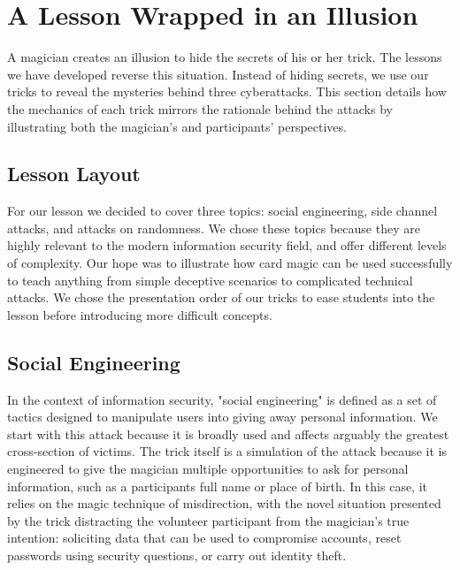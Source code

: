 \section{A Lesson Wrapped in an Illusion}
\label{SEC:background}


A magician creates an illusion to hide the secrets of his or her trick.
The lessons we have developed reverse this situation.
Instead of hiding secrets, we use our tricks to reveal
the mysteries behind
three cyberattacks.
This section details how the mechanics of each trick mirrors the
rationale behind the attacks by illustrating both the magician's and
participants' perspectives.


\subsection{Lesson Layout}

For our lesson we decided to cover three topics: social engineering, side
channel attacks, and attacks on randomness.  We chose these topics because they
are highly relevant to the modern information security field,
and offer different levels of complexity.
Our hope was to illustrate how card magic can be used
successfully to teach anything from simple deceptive scenarios to complicated
technical attacks.  We chose the presentation order of our tricks to ease
students into the lesson before introducing more difficult concepts.

\subsection{Social Engineering}

In the context of information security, "social engineering" is defined as a set
of tactics designed to manipulate users into giving away personal information.
We start with this attack because it is broadly used and affects arguably the
greatest cross-section of victims.  The trick itself
is a simulation of the attack because it is engineered to give
the magician multiple opportunities to ask for personal information,
such as a participants full name or place of birth.  In this case,
it relies on the magic technique of misdirection,
with the novel situation presented by the trick
distracting the
volunteer participant from the magician's true intention: soliciting data that
can be used to compromise accounts, reset passwords using security questions, or
carry out identity theft.

